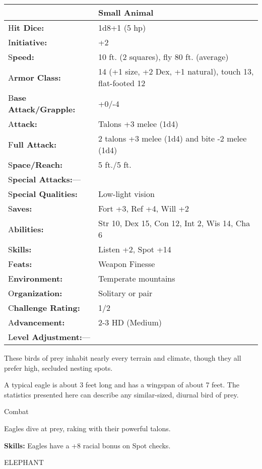 \documentclass{article}
\begin{document}
\begin{tabular}{|>{\raggedright}p{91pt}|>{\raggedright}p{226pt}|}
\hline
  & Small Animal\tabularnewline
\hline
H\textbf{it Dice:} & 1d8+1 (5 hp)\tabularnewline
\hline
I\textbf{nitiative:} & +2\tabularnewline
\hline
S\textbf{peed:} & 10 ft. (2 squares), fly 80 ft. (average)\tabularnewline
\hline
A\textbf{rmor Class:} & 14 (+1 size, +2 Dex, +1 natural), touch 13, flat-footed 
12\tabularnewline
\hline
B\textbf{ase Attack/Grapple:} & +0/-4\tabularnewline
\hline
A\textbf{ttack:} & Talons +3 melee (1d4)\tabularnewline
\hline
F\textbf{ull Attack:} & 2 talons +3 melee (1d4) and bite -2 melee (1d4)\tabularnewline
\hline
S\textbf{pace/Reach:} & 5 ft./5 ft.\tabularnewline
\hline
S\textbf{pecial Attacks:}--- & \tabularnewline
\hline
S\textbf{pecial Qualities:} & Low-light vision\tabularnewline
\hline
S\textbf{aves:} & Fort +3, Ref +4, Will +2\tabularnewline
\hline
A\textbf{bilities:} & Str 10, Dex 15, Con 12, Int 2, Wis 14, Cha 6\tabularnewline
\hline
S\textbf{kills:} & Listen +2, Spot +14\tabularnewline
\hline
F\textbf{eats:} & Weapon Finesse\tabularnewline
\hline
E\textbf{nvironment:} & Temperate mountains\tabularnewline
\hline
O\textbf{rganization:} & Solitary or pair\tabularnewline
\hline
C\textbf{hallenge Rating:} & 1/2\tabularnewline
\hline
A\textbf{dvancement:} & 2-3 HD (Medium)\tabularnewline
\hline
L\textbf{evel Adjustment:}--- & \tabularnewline
\hline
\end{tabular}

These birds of prey inhabit nearly every terrain and climate, though they all prefer 
high, secluded nesting spots.

A typical eagle is about 3 feet long and has a wingspan of about 7 feet. The statistics 
presented here can describe any similar-sized, diurnal bird of prey.

Combat

Eagles dive at prey, raking with their powerful talons. 

\textbf{Skills:} Eagles have a +8 racial bonus on Spot checks.

\vspace{12pt}
ELEPHANT
\end{document}

